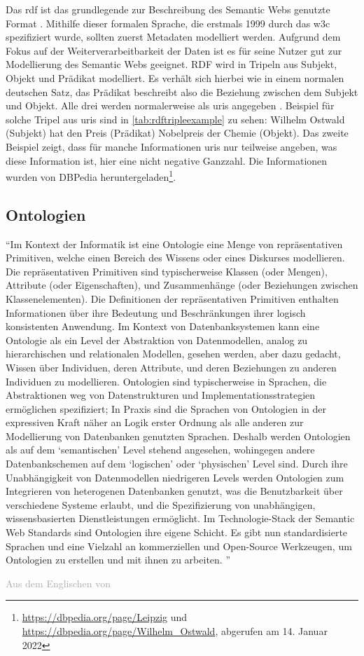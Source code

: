Das \ac{rdf} ist das grundlegende zur Beschreibung des Semantic Webs genutzte Format \citep[S.~35]{semanticwebgrundlagen}.
Mithilfe dieser formalen Sprache, die erstmals 1999 durch das \ac{w3c} spezifiziert wurde, sollten zuerst Metadaten modelliert werden.
Aufgrund dem Fokus auf der Weiterverarbeitbarkeit der Daten ist es für seine Nutzer gut zur Modellierung des Semantic Webs geeignet.
RDF wird in Tripeln aus Subjekt, Objekt und Prädikat modelliert.
Es verhält sich hierbei wie in einem normalen deutschen Satz, das Prädikat beschreibt also die Beziehung zwischen dem Subjekt und Objekt.
Alle drei werden normalerweise als \acp{uri} angegeben \citep{linkeddatadesignissues}.
Beispiel für solche Tripel aus \acp{uri} sind in \cref{tab:rdftripleexample} zu sehen:
Wilhelm Ostwald (Subjekt) hat den Preis (Prädikat) Nobelpreis der Chemie (Objekt).
Das zweite Beispiel zeigt, dass für manche Informationen \acp{uri} nur teilweise angeben, was diese Information ist, hier eine nicht negative Ganzzahl.
Die Informationen wurden von DBPedia heruntergeladen\footnote{\url{https://dbpedia.org/page/Leipzig} und \url{https://dbpedia.org/page/Wilhelm_Ostwald}, abgerufen am 14. Januar 2022}.

\subsection{Ontologien}
\begin{definition}[Ontologie]
\enquote{Im Kontext der Informatik ist eine Ontologie eine Menge von repräsentativen Primitiven, welche einen Bereich des Wissens oder eines Diskurses modellieren.
Die repräsentativen Primitiven sind typischerweise Klassen (oder Mengen), Attribute (oder Eigenschaften), und Zusammenhänge (oder Beziehungen zwischen Klassenelementen).
Die Definitionen der repräsentativen Primitiven enthalten Informationen über ihre Bedeutung und Beschränkungen ihrer logisch konsistenten Anwendung.
Im Kontext von Datenbanksystemen kann eine Ontologie als ein Level der Abstraktion von Datenmodellen, analog zu hierarchischen und relationalen Modellen, gesehen werden, aber dazu gedacht, Wissen über Individuen, deren Attribute, und deren Beziehungen zu anderen Individuen zu modellieren.
Ontologien sind typischerweise in Sprachen, die Abstraktionen weg von Datenstrukturen und Implementationsstrategien ermöglichen spezifiziert;
In Praxis sind die Sprachen von Ontologien in der expressiven Kraft näher an Logik erster Ordnung als alle anderen zur Modellierung von Datenbanken genutzten Sprachen.
Deshalb werden Ontologien als auf dem \enquote{semantischen} Level stehend angesehen, wohingegen andere Datenbankschemen auf dem \enquote{logischen} oder \enquote{physischen} Level sind.
Durch ihre Unabhängigkeit von Datenmodellen niedrigeren Levels werden Ontologien zum Integrieren von heterogenen Datenbanken genutzt, was die Benutzbarkeit über verschiedene Systeme erlaubt, und die Spezifizierung von unabhängigen, wissensbasierten  Dienstleistungen ermöglicht.
Im Technologie-Stack der Semantic Web Standards sind Ontologien ihre eigene Schicht.
Es gibt nun standardisierte Sprachen und eine Vielzahl an kommerziellen und Open-Source Werkzeugen, um Ontologien zu erstellen und mit ihnen zu arbeiten.
}
\end{definition}
\textcolor{darkgray}{Aus dem Englischen von \citet{ontologygruber}}
